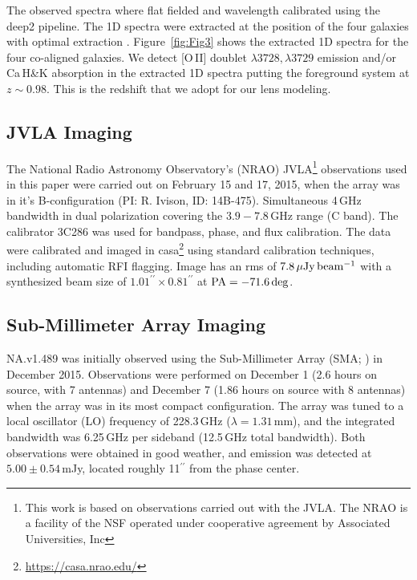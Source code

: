 \documentclass[iop,apj,useAMS,usenatbib]{emulateapj-rtx4}
\begin{document}
The observed spectra where flat fielded and wavelength calibrated
using the {\sc deep2} pipeline. The 1D spectra were extracted at the
position of the four galaxies with optimal extraction \citep
{Horne1986}. Figure~\ref{fig:Fig3} shows the extracted 1D spectra for
the four co-aligned galaxies. We detect [O\,II] doublet $\lambda3728,
\lambda3729$ emission and/or Ca\,H\&K
absorption in the extracted 1D spectra putting the foreground system
at $z \sim 0.98$. This is the redshift that we adopt for our lens
modeling.

\subsection{JVLA Imaging}

The National Radio Astronomy Observatory’s (NRAO) JVLA\setcounter{footnote}{0}\footnote{This work is based on observations carried out with the
  JVLA. The NRAO is a facility of the NSF operated under cooperative
  agreement by Associated Universities, Inc} observations used in this
paper were carried out on February 15 and 17, 2015, when the array was
in it’s B-configuration (PI: R. Ivison, ID: 14B-475). Simultaneous 4\,GHz bandwidth in dual
polarization covering the $3.9-7.8$\,GHz range (C band). The
calibrator 3C286 was used for bandpass, phase, and flux calibration. The
data were calibrated and imaged in
{\sc casa}\footnote{\url{https://casa.nrao.edu/}} using standard calibration
techniques, including automatic RFI flagging. Image has
an rms of $\rm 7.8\,\mu Jy\,beam^{-1}$
with a synthesized beam size of $1.01^{\prime\prime} \times
0.81^{\prime\prime}$ at ${\rm PA = -71.6\,deg}$.

\subsection{Sub-Millimeter Array Imaging}

NA.v1.489 was initially observed using the Sub-Millimeter Array (SMA;
\citealp{Ho2004}) in December 2015. Observations
were performed on December 1 (2.6 hours on source, with 7 antennas) and December
7 (1.86 hours on source with 8 antennas) when the array was in its
most compact configuration. The
array was tuned to a local oscillator (LO) frequency of 228.3\,GHz
($\lambda=1.31$\,mm), and the integrated bandwidth was 6.25\,GHz per
sideband (12.5\,GHz total bandwidth). Both observations were obtained
in good weather, and emission was detected at $5.00\pm0.54$\,mJy, located
roughly 11$^{\prime\prime}$ from the phase center. 
\end{document}
